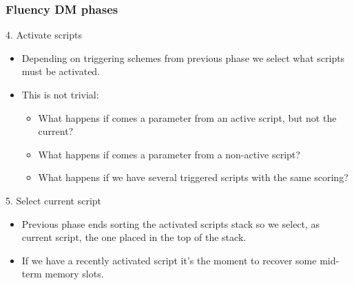 \documentclass[11pt]{beamer}
\begin{document}
\begin{frame}[fragile]
\frametitle{Fluency DM phases}
	\footnotesize
	\begin{block}{4. Activate scripts}
	\begin{itemize}
		\item Depending on triggering schemes from previous phase we select what scripts must be activated.
		\item This is not trivial:
		\begin{itemize}
			\item What happens if comes a parameter from an active script, but not the current?
			\item What happens if comes a parameter from a non-active script?
			\item What happens if we have several triggered scripts with the same scoring?
		\end{itemize}
	\end{itemize}
	\end{block}
	\pause
	\footnotesize
	\begin{block}{5. Select current script}
	\begin{itemize}
		\item Previous phase ends sorting the activated scripts stack so we select, as current script, the one placed in the top of the stack.
		\item If we have a recently activated script it's the moment to recover some mid-term memory slots.
	\end{itemize}
	\end{block}
\end{frame}
\end{document}
